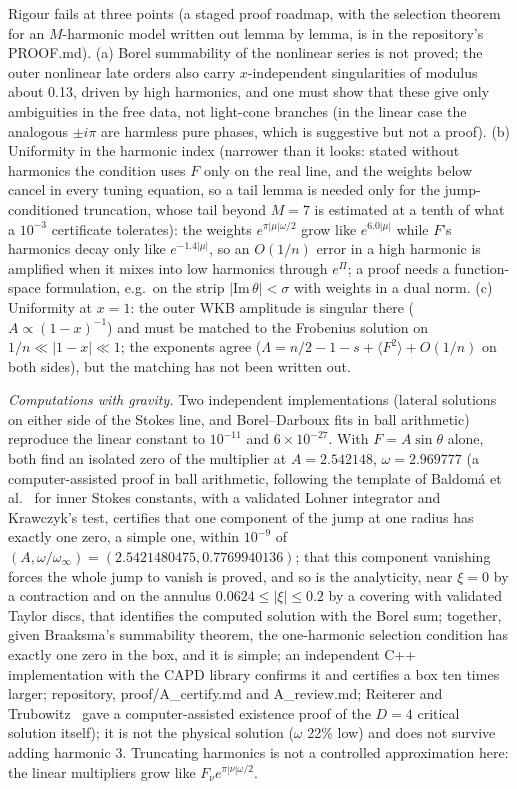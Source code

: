 \documentclass[aps,prd,onecolumn,superscriptaddress,nofootinbib,10pt]{revtex4-2}
\begin{document}
Rigour fails at three points (a staged proof roadmap, with the selection theorem for an $M$-harmonic model
written out lemma by lemma, is in the repository's PROOF.md). (a) Borel summability of the nonlinear series is not proved; the outer nonlinear late
orders also carry $x$-independent singularities of modulus about 0.13, driven by high harmonics, and one must show that
these give only ambiguities in the free data, not light-cone branches (in the linear case the analogous $\pm i\pi$ are
harmless pure phases, which is suggestive but not a proof). (b) Uniformity in the harmonic index (narrower than it looks: stated without harmonics the condition uses $F$ only on the
real line, and the weights below cancel in every tuning equation, so a tail lemma is needed only for the jump-conditioned
truncation, whose tail beyond $M = 7$ is estimated at a tenth of what a $10^{-3}$ certificate tolerates): the weights
$e^{\pi|\mu|\omega/2}$ grow like $e^{6.0|\mu|}$ while $F$'s harmonics decay only like $e^{-1.4|\mu|}$, so an $O(1/n)$ error in a
high harmonic is amplified when it mixes into low harmonics through $e^{\Pi}$; a proof needs a function-space formulation,
e.g.\ on the strip $|\mathrm{Im}\,\theta| < \sigma$ with weights in a dual norm. (c) Uniformity at $x = 1$: the outer WKB
amplitude is singular there ($A \propto (1-x)^{-1}$) and must be matched to the Frobenius solution on
$1/n \ll |1-x| \ll 1$; the exponents agree ($\Lambda = n/2 - 1 - s + \langle F^2\rangle + O(1/n)$ on both sides), but the matching
has not been written out.

\emph{Computations with gravity.} Two independent implementations (lateral solutions on either side of the Stokes
line, and Borel--Darboux fits in ball arithmetic) reproduce the linear constant to $10^{-11}$ and $6\times10^{-27}$. With
$F = A\sin\theta$ alone, both find an isolated zero of the multiplier at $A = 2.542148$, $\omega = 2.969777$ (a computer-assisted
proof in ball arithmetic, following the template of Baldom\'a et al.~\cite{BaldomaEtAl2023} for inner Stokes constants,
with a validated Lohner integrator and Krawczyk's test, certifies that one component of
the jump at one radius has exactly one zero, a simple one, within $10^{-9}$ of
$(A, \omega/\omega_\infty) = (2.5421480475, 0.7769940136)$; that this component vanishing forces the whole jump to vanish is
proved, and so is the analyticity, near $\xi = 0$ by a contraction and on the annulus $0.0624 \le |\xi| \le 0.2$ by a covering
with validated Taylor discs, that identifies the computed solution with the Borel sum; together, given Braaksma's
summability theorem, the one-harmonic selection condition has exactly one zero in the box, and it is simple; an
independent C++ implementation with the CAPD library confirms it and certifies a box ten times larger;
repository, proof/A\_certify.md and A\_review.md; Reiterer and Trubowitz~\cite{ReitererTrubowitz2019} gave a
computer-assisted existence proof of the $D = 4$ critical solution itself); it is not the
physical solution ($\omega$ 22\% low) and does not survive adding harmonic 3. Truncating harmonics is not a controlled
approximation here: the linear multipliers grow like $F_\nu e^{\pi|\nu|\omega/2}$.
\end{document}
